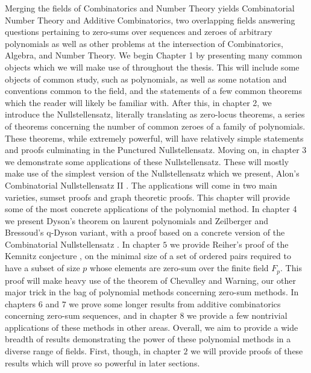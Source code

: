 Merging the fields of Combinatorics and Number Theory yields Combinatorial Number Theory and Additive Combinatorics, two overlapping fields answering questions pertaining to zero-sums over sequences and zeroes of arbitrary polynomials as well as other problems at the intersection of Combinatorics, Algebra, and Number Theory. We begin Chapter 1 by presenting many common objects which we will make use of throughout the thesis. This will include some objects of common study, such as polynomials, as well as some notation and conventions common to the field, and the statements of a few common theorems which the reader will likely be familiar with. After this, in chapter 2, we introduce the Nullstellensatz, literally translating as zero-locus theorems, a series of theorems concerning the number of common zeroes of a family of polynomials. These theorems, while extremely powerful, will have relatively simple statements and proofs culminating in the Punctured Nullstellensatz.
Moving on, in chapter 3 we demonstrate some applications of these Nullstellensatz. These will mostly make use of the simplest version of the Nullstellensatz which we present, Alon's Combinatorial Nullstellensatz II \cite{alon_1999}. The applications will come in two main varieties, sumset proofs and graph theoretic proofs. This chapter will provide some of the most concrete applications of the polynomial method. In chapter 4 we present Dyson's theorem \cite{dyson_1963} on laurent polynomials and Zeilberger and Bressoud's q-Dyson variant, with a proof based on a concrete version of the Combinatorial Nullstellensatz \cite{qdyson_2014}. In chapter \(5\) we provide Reiher's proof of the Kemnitz conjecture \cite{reiher_2007}, on the minimal size of a set of ordered pairs required to have a subset of size \(p\) whose elements are zero-sum over the finite field \(F_{p}\). This proof will make heavy use of the theorem of Chevalley and Warning, our other major trick in the bag of polynomial methods concerning zero-sum methods. In chapters \(6\) and \(7\) we prove some longer results from additive combinatorics concerning zero-sum sequences, and in chapter \(8\) we provide a few nontrivial applications of these methods in other areas. Overall, we aim to provide a wide breadth of results demonstrating the power of these polynomial methods in a diverse range of fields. First, though, in chapter \(2\) we will provide proofs of these results which will prove so powerful in later sections.
\newpage
